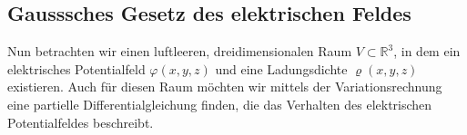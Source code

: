 %
%
%
%
\subsection{Gausssches Gesetz des elektrischen Feldes
\label{maxwell:section:elektrostatik_mit_quelle}}
Nun betrachten wir einen luftleeren, dreidimensionalen Raum $V\subset\mathbb{R}^3$, in dem ein elektrisches Potentialfeld $\varphi(x,y,z)$ und eine Ladungsdichte $\varrho(x,y,z)$ existieren.
Auch für diesen Raum möchten wir mittels der Variationsrechnung eine partielle Differentialgleichung finden, die das Verhalten des elektrischen Potentialfeldes beschreibt.

